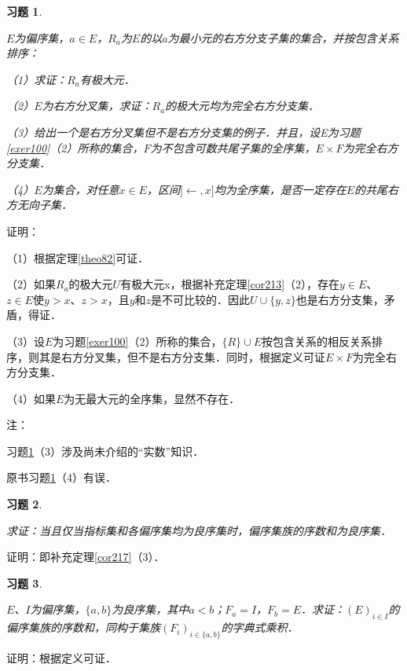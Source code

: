 \documentclass[12pt, a4paper, oneside]{book}
\newtheorem{exer}{习题}
\begin{document}
			\begin{exer}\label{exer108}
				\hfill\par
				$E$为偏序集，$a\in E$，$R_a$为$E$的以$a$为最小元的右方分支子集的集合，并按包含关系排序：
				\par
				（1）求证：$R_a$有极大元．
				\par
				（2）$E$为右方分叉集，求证：$R_a$的极大元均为完全右方分支集．
				\par
				（3）给出一个是右方分叉集但不是右方分支集的例子．并且，设E为习题\ref{exer100}（2）所称的集合，$F$为不包含可数共尾子集的全序集，$E\times F$为完全右方分支集．
				\par
				（4）$E$为集合，对任意$x\in E$，区间$]\gets, x]$均为全序集，是否一定存在$E$的共尾右方无向子集．
			\end{exer}
			证明：
			\par
			（1）根据定理\ref{theo82}可证．
			\par
			（2）如果$R_a$的极大元$U$有极大元x，根据补充定理\ref{cor213}（2），存在$y\in E$、$z\in E$使$y>x$、$z>x$，且$y$和$z$是不可比较的．因此$U\cup \{y, z\}$也是右方分支集，矛盾，得证．
			\par
			（3）设$E$为习题\ref{exer100}（2）所称的集合，$\{R\}\cup E$按包含关系的相反关系排序，则其是右方分叉集，但不是右方分支集．同时，根据定义可证$E\times F$为完全右方分支集．
			\par
			（4）如果$E$为无最大元的全序集，显然不存在．
			\par
			注：
			\par
			习题\ref{exer108}（3）涉及尚未介绍的“实数”知识．
			\par
			原书习题\ref{exer108}（4）有误．
			
			\begin{exer}\label{exer109}
				\hfill\par
				求证：当且仅当指标集和各偏序集均为良序集时，偏序集族的序数和为良序集．
			\end{exer}
			证明：即补充定理\ref{cor217}（3）．
						
			\begin{exer}\label{exer110}
				\hfill\par
				$E$、$I$为偏序集，$\{a, b\}$为良序集，其中$a<b$；$F_a=I$，$F_b=E$．求证：$(E)_{i\in I}$的偏序集族的序数和，同构于集族$(F_i)_{i\in \{a, b\}}$的字典式乘积．
			\end{exer}
			证明：根据定义可证．
						
\end{document}

